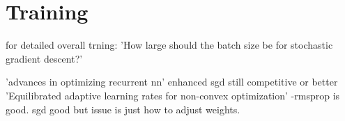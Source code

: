 \section{Training}

for detailed overall trning: 'How large should the batch size be for stochastic gradient descent?'


'advances in optimizing recurrent nn' enhanced sgd still competitive or better
'Equilibrated adaptive learning rates for non-convex optimization' -rmsprop is good. sgd good but issue is just how to adjust weights.



